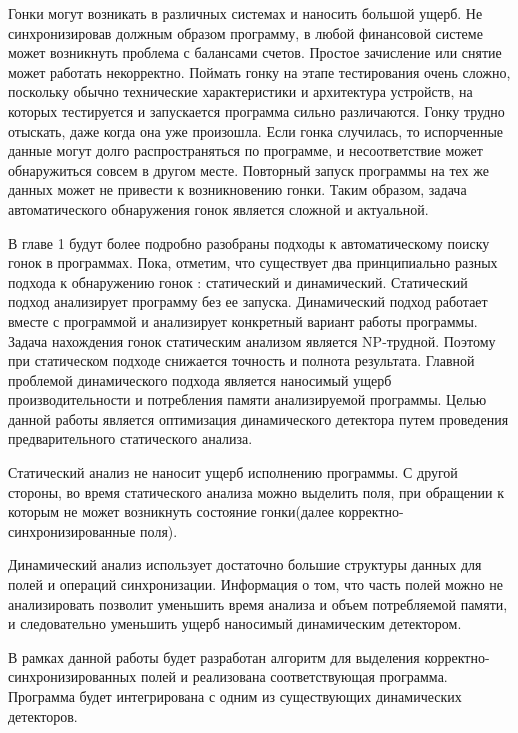 Гонки могут возникать в различных системах и наносить большой ущерб. Не синхронизировав должным образом программу, в любой финансовой системе может возникнуть проблема с балансами счетов. Простое зачисление или снятие может работать некорректно. Поймать гонку на этапе тестирования очень сложно, поскольку обычно технические характеристики и архитектура устройств, на которых тестируется и запускается программа сильно различаются. Гонку трудно отыскать, даже когда она уже произошла. Если гонка случилась, то испорченные данные могут долго распространяться по программе, и несоответствие может обнаружиться совсем в другом месте. Повторный запуск программы на тех же данных может не привести к возникновению гонки. Таким образом, задача автоматического обнаружения гонок является
сложной и актуальной.

В главе 1 будут более подробно разобраны подходы к автоматическому поиску гонок в программах. Пока, отметим, что существует два принципиально разных подхода к обнаружению гонок : статический и динамический. Статический подход  анализирует программу без ее запуска. Динамический подход работает вместе с программой и анализирует конкретный вариант работы программы. Задача нахождения гонок статическим анализом является NP-трудной. Поэтому при статическом подходе снижается точность и полнота результата. Главной проблемой динамического подхода является наносимый ущерб производительности и потребления памяти анализируемой программы. Целью данной работы является оптимизация динамического детектора путем проведения предварительного статического анализа. 

Статический анализ не наносит ущерб исполнению программы. С другой стороны, во время статического анализа можно выделить поля, при обращении к которым не может возникнуть состояние гонки(далее корректно-синхронизированные поля).

Динамический анализ использует достаточно большие структуры данных для полей и операций синхронизации. Информация о том, что часть полей можно не анализировать позволит уменьшить время анализа и объем потребляемой памяти, и следовательно уменьшить ущерб наносимый динамическим детектором.

В рамках данной работы будет разработан алгоритм для выделения корректно-синхронизированных полей и реализована соответствующая программа. Программа будет интегрирована с одним из существующих динамических детекторов.

\FloatBarrier

